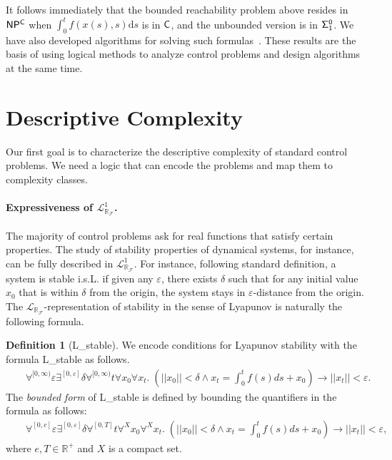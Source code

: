 \documentclass[10pt]{article}
\newcommand{\lrf}{\mathcal{L}_{\mathbb{R}_{\mathcal{F}}}}
\theoremstyle{definition}
\newtheorem{definition}{Definition}
\begin{document}
It follows immediately that the bounded reachability problem above resides in ${\sf NP^C}$ when $\int_{0}^t f(x(s),s)\mathrm{d}s$ is in ${\sf C}$, and the unbounded version is in ${\sf \Sigma^0_1}$. We have also developed algorithms for solving such formulas~\cite{DBLP:conf/fmcad/GaoKC13}. These results are the basis of using logical methods to analyze control problems and design algorithms at the same time. 


\section{Descriptive Complexity}


Our first goal is to characterize the descriptive complexity of standard control problems. We need a logic that can encode the problems and map them to complexity classes. 

\paragraph{Expressiveness of $\lrf^1$.} The majority of control problems ask for real functions that satisfy certain properties. The study of stability properties of dynamical systems, for instance, can be fully described in $\lrf^1$. For instance, following standard definition, a system is stable i.s.L. if given any $\varepsilon$, there exists $\delta$ such that for any initial value $x_0$ that is within $\delta$ from the origin, the system stays in $\varepsilon$-distance from the origin. The $\lrf$-representation of stability in the sense of Lyapunov is naturally the following formula. 
\begin{definition}[{\sf L\_stable}]
We encode conditions for Lyapunov stability with the formula {\sf L\_stable} as follows. 
\begin{eqnarray*}
& &\forall^{[0,\infty)} \varepsilon\exists^{[0,\varepsilon]} \delta \forall^{[0,\infty)} t\forall x_0\forall x_t .\; (||x_0||<\delta \wedge x_t = \int_0^t f(s)ds + x_0 )\rightarrow ||x_t||<\varepsilon.
\end{eqnarray*}
The {\em bounded form} of {\sf L\_stable} is defined by bounding the quantifiers in the formula as follows:
\begin{eqnarray*}
& &\forall^{[0, e]} \varepsilon\exists^{[0,\varepsilon]} \delta \forall^{[0,T]} t\forall^X x_0\forall^X x_t. \;(||x_0||<\delta \wedge x_t = \int_0^t f(s)ds + x_0 )\rightarrow ||x_t||<\varepsilon, 
\end{eqnarray*}
where $e, T\in \mathbb{R}^+$ and $X$ is a compact set.
\end{definition}
\end{document}
